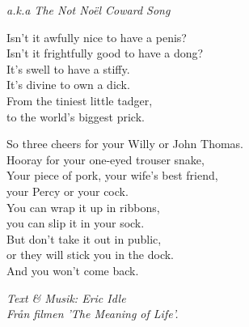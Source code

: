 {\footnotesize\textit{a.k.a The Not Noël Coward Song}}\par
\vspace{10pt}
Isn't it awfully nice to have a penis?\\
Isn't it frightfully good to have a dong?\\
It's swell to have a stiffy.\\
It's divine to own a dick.\\
From the tiniest little tadger,\\
to the world's biggest prick.\par
\vspace{10pt}
So three cheers for your Willy or John Thomas.\\
Hooray for your one-eyed trouser snake,\\
Your piece of pork, your wife's best friend,\\
your Percy or your cock.\\
You can wrap it up in ribbons,\\
you can slip it in your sock.\\
But don't take it out in public,\\
or they will stick you in the dock.\\
And you won't come back.
\par
\vspace{10pt}
{\footnotesize\textit{Text \& Musik: Eric Idle \\
Från filmen 'The Meaning of Life'.}}
